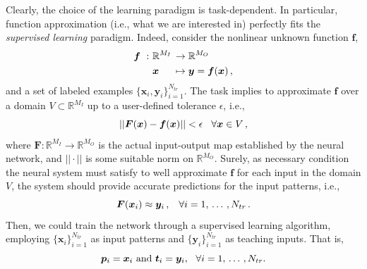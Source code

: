 \documentclass[12pt, a4paper, twoside, openright]{report}
\numberwithin{equation}{chapter}
\theoremstyle{theorem}
\theoremstyle{definition}
\theoremstyle{remark}
\theoremstyle{proposition}
\numberwithin{figure}{chapter}
\begin{document}
		\vspace*{0.3cm}
		
		Clearly, the choice of the learning paradigm is task-dependent. In particular, function approximation (i.e., what we are interested in) perfectly fits the \emph{supervised learning} paradigm. Indeed, consider the nonlinear unknown function $\boldsymbol{f}$,
		\begin{equation*}
			\begin{aligned}
				\boldsymbol{f} ~ : ~ & \mathbb{R}^{M_I} \hspace*{-0.3cm} && \rightarrow \mathbb{R}^{M_O} \\
								   & \boldsymbol{x} && \mapsto \boldsymbol{y} = \boldsymbol{f}(\boldsymbol{x}) \, ,
			\end{aligned}
		\end{equation*}
		and a set of labeled examples $\big\lbrace \boldsymbol{x}_i, \boldsymbol{y}_i \big\rbrace_{i = 1}^{N_{tr}}$. The task implies to approximate $\boldsymbol{f}$ over a domain $V \subset \mathbb{R}^{M_I}$ up to a user-defined tolerance $\epsilon$, i.e.,
		\begin{equation*}
			||\boldsymbol{F}(\boldsymbol{x}) - \boldsymbol{f}(\boldsymbol{x})|| < \epsilon \hspace*{0.3cm} \text{$\forall \boldsymbol{x} \in V$} \, ,
		\end{equation*}
		where $\boldsymbol{F} : \mathbb{R}^{M_I} \rightarrow \mathbb{R}^{M_O}$ is the actual input-output map established by the neural network, and $||\cdot||$ is some suitable norm on $\mathbb{R}^{M_O}$. Surely, as necessary condition the neural system must satisfy to well approximate $\boldsymbol{f}$ for each input in the domain $V$, the system should provide accurate predictions for the input patterns, i.e., 
		\begin{equation*}
			\boldsymbol{F}(\boldsymbol{x}_i) \approx \boldsymbol{y}_i \, , \hspace*{0.3cm} \text{$\forall i = 1, \, \ldots \, , N_{tr}$} \, .
		\end{equation*} 
		Then, we could train the network through a supervised learning algorithm, employing $\big\lbrace \boldsymbol{x}_i \big\rbrace_{i = 1}^{N_{tr}}$ as input patterns and $\big\lbrace \boldsymbol{y}_i \big\rbrace_{i = 1}^{N_{tr}}$ as teaching inputs. That is, 
		\begin{equation*}
			\text{$\boldsymbol{p}_i = \boldsymbol{x}_i$ and $\boldsymbol{t}_i = \boldsymbol{y}_i$,} \hspace*{0.3cm} \text{$\forall i = 1, \, \ldots \, , N_{tr}$.}
		\end{equation*}
		
\end{document}
